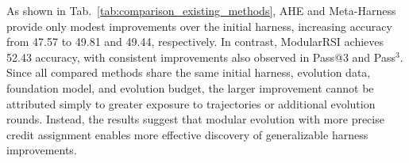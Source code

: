 \documentclass{article} %
\begin{document}
\begin{table}
\vspace{-8pt}
\centering
\small
\setlength{\tabcolsep}{4pt}

\caption{Comparison with existing harness evolution methods on TerminalBench 2.0.}
\label{tab:comparison_existing_methods}


\vspace{-8pt}
\end{table}



As shown in Tab.~\ref{tab:comparison_existing_methods}, AHE and Meta-Harness provide only modest improvements over the initial harness, increasing accuracy from 47.57 to 49.81 and 49.44, respectively. In contrast, ModularRSI achieves 52.43 accuracy, with consistent improvements also observed in Pass@3 and Pass$^3$. Since all compared methods share the same initial harness, evolution data, foundation model, and evolution budget, the larger improvement cannot be attributed simply to greater exposure to trajectories or additional evolution rounds. Instead, the results suggest that modular evolution with more precise credit assignment enables more effective discovery of generalizable harness improvements.
\end{document}
